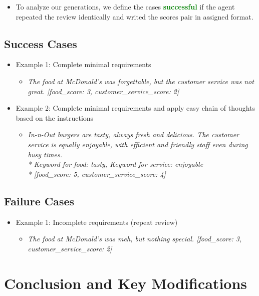 \documentclass{article}
\begin{document}
\begin{itemize}
	\item To analyze our generations, we define the cases \textcolor{green}{\textbf{successful}} if the agent repeated the review identically and writed the scores pair in assigned format.
\end{itemize}

\subsection*{Success Cases}
\begin{itemize}
  \item Example 1: Complete minimal requirements
    \begin{itemize}
		\item \textit{The food at McDonald's was forgettable, but the customer service was not great. [food\_score: 3, customer\_service\_score: 2]}
	\end{itemize}
  \item Example 2: Complete minimal requirements and apply easy chain of thoughts based on the instructions
    \begin{itemize}
		\item \textit{In-n-Out burgers are tasty, always fresh and delicious. The customer service is equally enjoyable, with efficient and friendly staff even during busy times.} \\
			\textit{* Keyword for food: tasty, Keyword for service: enjoyable} \\
			\textit{* [food\_score: 5, customer\_service\_score: 4]}
	\end{itemize}
\end{itemize}

\subsection*{Failure Cases}
\begin{itemize}
  \item Example 1: Incomplete requirements (repeat review)
    \begin{itemize}
		\item \textit{The food at McDonald's was meh, but nothing special. [food\_score: 3, customer\_service\_score: 2]}
	\end{itemize}
\end{itemize}

\section*{Conclusion and Key Modifications}
\label{sec:conclusion}
\end{document}
